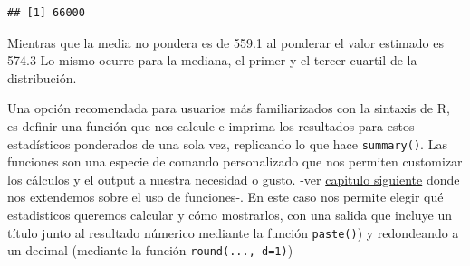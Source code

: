 \documentclass[
]{book}
\newenvironment{Shaded}{\begin{snugshade}}{\end{snugshade}}
\newcommand{\AttributeTok}[1]{\textcolor[rgb]{0.77,0.63,0.00}{#1}}
\newcommand{\FunctionTok}[1]{\textcolor[rgb]{0.00,0.00,0.00}{#1}}
\newcommand{\NormalTok}[1]{#1}
\newcommand{\SpecialCharTok}[1]{\textcolor[rgb]{0.00,0.00,0.00}{#1}}
\begin{document}
\begin{Shaded}
\end{Shaded}

\begin{verbatim}
## [1] 66000
\end{verbatim}

Mientras que la media no pondera es de 559.1 al ponderar el valor estimado es 574.3
Lo mismo ocurre para la mediana, el primer y el tercer cuartil de la distribución.

Una opción recomendada para usuarios más familiarizados con la sintaxis de R, es definir una función que nos calcule e imprima los resultados para estos estadísticos ponderados de una sola vez, replicando lo que hace \texttt{summary()}. Las funciones son una especie de comando personalizado que nos permiten customizar los cálculos y el output a nuestra necesidad o gusto. -ver \protect\hyperlink{cap-3.2}{capitulo siguiente} donde nos extendemos sobre el uso de funciones-. En este caso nos permite elegir qué estadisticos queremos calcular y cómo mostrarlos, con una salida que incluye un título junto al resultado númerico mediante la función \texttt{paste()}) y redondeando a un decimal (mediante la función \texttt{round(...,\ d=1)})
\end{document}
